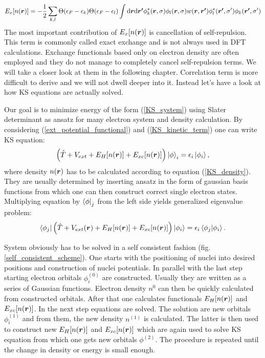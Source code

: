 \documentclass[openany, longbibliography,slovene,a4paper,12pt]{article}
\def\vec#1{\mbox{\boldmath$#1$}}
\newcommand{\dif}{\mathrm{d}}
\begin{document}
\begin{equation}
  E_{x}[n(\vec r)]=-\frac{1}{2}\sum_{k,l}\Theta(\epsilon_F-\epsilon_k)\Theta(\epsilon_F-\epsilon_l)\int \dif \vec{r} \dif \vec{r'}\phi^*_k(\vec r, \sigma)\phi_l(\vec{r}, \sigma)w(\vec{r},\vec{r'})\phi^*_l(\vec{r'}, \sigma')\phi_k(\vec{r'}, \sigma')
\end{equation}
The most important contribution of $E_{x}[n(\vec r)]$ is cancellation of
self-repulsion. This term is commonly called exact exchange and is not always
used in DFT calculations. Exchange functionals based only on
electron density are often employed and they do not manage to completely cancel
self-repulsion terms. We will take a closer look at them in the following chapter.
Correlation term is more difficult to derive and we will not dwell deeper into
it. Instead let's have a look at how KS equations are actually solved.

Our goal is to minimize energy of the form (\ref{KS_system}) using Slater
determinant as ansatz for many electron system and density calculation. By
considering (\ref{ext_potential_functional}) and (\ref{KS_kinetic_term}) one can
write KS equation:  
\begin{equation}
  \left( \hat T + V_{ext} + E_H[n(\vec r)]  + E_{xc}[n(\vec r)] \right) \ket \phi_i =  \epsilon_i \ket{\phi_i},  
\end {equation}
where density $n(\vec r)$  has to be calculated according to equation
(\ref{KS_density}). They are usually determined by inserting ansatz in the
form of gaussian basis functions from which one can
then construct correct single electron states. Multiplying equation by $\bra
\phi_j$ from the left side yields generalized eigenvalue problem:
\begin{equation}
  \bra {\phi_j} \left( \hat T + V_{ext}(\vec r) + E_H[n(\vec r)]  + E_{xc}[n(\vec r)] \right) \ket{\phi_i} =  \epsilon_i \braket{ \phi_j |\phi_i }.
\end {equation}

System obviously has to be solved in a self consistent fashion
(fig. \ref{self_consistent_scheme}). One starts with the positioning of nuclei into
desired positions and construction of nuclei potentials. In parallel with the
last step starting electron orbitals $\phi^{(0)}_i$ are constructed. Usually they are written
as a series of Gaussian functions. Electron density $n^0$ can then be quickly
calculated from constructed orbitals. After that one
calculates functionals $E_H[n(\vec r)]$ and $E_{xc}[n(\vec r)]$. In the next step
equations are solved. The solution are new orbitals $\phi_i^{(1)}$  and from
them, the new density $n^{(1)}$ is calculated. The latter is then used to construct new $E_H[n(\vec r)]$ and $E_{xc}[n(\vec r)]$ which are again used to
solve KS equation from which one gets new orbitals $\phi^{(2)}$. The procedure is
repeated until the change in density or energy is small enough. 
\end{document}
